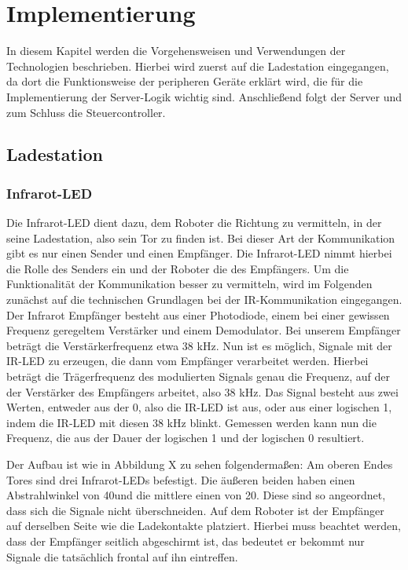 \chapter{Implementierung}
\label{ch:implementierung}

In diesem Kapitel werden die Vorgehensweisen und Verwendungen der Technologien beschrieben. Hierbei wird zuerst auf die Ladestation eingegangen, da dort die Funktionsweise der peripheren Geräte erklärt wird, die für die Implementierung der Server-Logik wichtig sind. Anschließend folgt der Server und zum Schluss die Steuercontroller.


\section{Ladestation}



\subsection{Infrarot-LED}
\label{sec:infrarot_led}
Die Infrarot-LED dient dazu, dem Roboter die Richtung zu vermitteln, in der seine Ladestation, also sein Tor zu finden ist. Bei dieser Art der Kommunikation gibt es nur einen Sender und einen Empfänger. Die Infrarot-LED nimmt hierbei die Rolle des Senders ein und der Roboter die des Empfängers. 
Um die Funktionalität der Kommunikation besser zu vermitteln, wird im Folgenden zunächst auf die technischen Grundlagen bei der IR-Kommunikation eingegangen.
Der Infrarot Empfänger besteht aus einer Photodiode, einem bei einer gewissen Frequenz geregeltem Verstärker und einem Demodulator. Bei unserem Empfänger beträgt die Verstärkerfrequenz etwa 38 kHz. Nun ist es möglich, Signale mit der IR-LED zu erzeugen, die dann vom Empfänger verarbeitet werden. Hierbei beträgt die Trägerfrequenz des modulierten Signals genau die Frequenz, auf der der Verstärker des Empfängers arbeitet, also 38 kHz. Das Signal besteht aus zwei Werten, entweder aus der 0, also die IR-LED ist aus, oder aus einer logischen 1, indem die IR-LED mit diesen 38 kHz blinkt. Gemessen werden kann nun die Frequenz, die aus der Dauer der logischen 1 und der logischen 0 resultiert. 

Der Aufbau ist wie in %
Abbildung X zu sehen folgendermaßen:
Am oberen Endes Tores sind drei Infrarot-LEDs befestigt. Die äußeren beiden haben einen Abstrahlwinkel von 40\degree  und die mittlere einen von 20\degree. Diese sind so angeordnet, dass sich die Signale nicht überschneiden. Auf dem Roboter ist der Empfänger auf derselben Seite wie die Ladekontakte platziert. Hierbei muss beachtet werden, dass der Empfänger seitlich abgeschirmt ist, das bedeutet er bekommt nur Signale die tatsächlich frontal auf ihn eintreffen.

